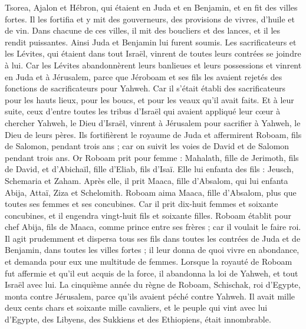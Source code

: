 \begin{multicols}{2}
Tsorea, Ajalon et Hébron, qui étaient en Juda et en Benjamin, et en fit des villes fortes.
Il les fortifia et y mit des gouverneurs, des provisions de vivres, d'huile et de vin.
Dans chacune de ces villes, il mit des boucliers et des lances, et il les rendit puissantes. Ainsi Juda et Benjamin lui furent soumis.
Les sacrificateurs et les Lévites, qui étaient dans tout Israël, vinrent de toutes leurs contrées se joindre à lui.
Car les Lévites abandonnèrent leurs banlieues et leurs possessions et vinrent en Juda et à Jérusalem, parce que Jéroboam et ses fils les avaient rejetés des fonctions de sacrificateurs pour Yahweh.
Car il s'était établi des sacrificateurs pour les hauts lieux, pour les boucs, et pour les veaux qu'il avait faits.
Et à leur suite, ceux d'entre toutes les tribus d'Israël qui avaient appliqué leur cœur à chercher Yahweh, le Dieu d'Israël, vinrent à Jérusalem pour sacrifier à Yahweh, le Dieu de leurs pères.
Ils fortifièrent le royaume de Juda et affermirent Roboam, fils de Salomon, pendant trois ans ; car on suivit les voies de David et de Salomon pendant trois ans.
Or Roboam prit pour femme : Mahalath, fille de Jerimoth, fils de David, et d'Abichaïl, fille d'Eliab, fils d'Isaï.
Elle lui enfanta des fils : Jeusch, Schemaria et Zaham.
Après elle, il prit Maaca, fille d'Absalom, qui lui enfanta Abija, Attaï, Ziza et Schelomith.
Roboam aima Maaca, fille d'Absalom, plus que toutes ses femmes et ses concubines. Car il prit dix-huit femmes et soixante concubines, et il engendra vingt-huit fils et soixante filles.
Roboam établit pour chef Abija, fils de Maaca, comme prince entre ses frères ; car il voulait le faire roi.
Il agit prudemment et dispersa tous ses fils dans toutes les contrées de Juda et de Benjamin, dans toutes les villes fortes ; il leur donna de quoi vivre en abondance, et demanda pour eux une multitude de femmes.
\VerseOne{}Lorsque la royauté de Roboam fut affermie et qu'il eut acquis de la force, il abandonna la loi de Yahweh, et tout Israël avec lui.
La cinquième année du règne de Roboam, Schischak, roi d'Egypte, monta contre Jérusalem, parce qu'ils avaient péché contre Yahweh.
Il avait mille deux cents chars et soixante mille cavaliers, et le peuple qui vint avec lui d'Egypte, des Libyens, des Sukkiens et des Ethiopiens, était innombrable.

\end{multicols}
